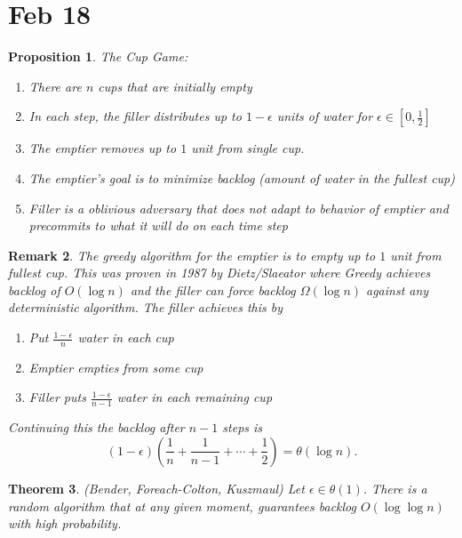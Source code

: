 \documentclass[a4paper]{article}
\newtheorem{thm}{Theorem}[section]
\newtheorem{rmk}[thm]{Remark}
\newtheorem{prop}[thm]{Proposition}
\begin{document}
\section{Feb 18}
\begin{prop}
    The Cup Game: 
    \begin{enumerate}
        \item There are $n$ cups that are initially empty 
        \item In each step, the filler distributes up to $1-\epsilon$ units of water for $\epsilon\in [0,\frac{1}{2}]$
        \item The emptier removes up to $1$ unit from single cup. 
        \item The emptier's goal is to minimize backlog (amount of water in the fullest cup)
        \item Filler is a oblivious adversary that does not adapt to behavior of emptier and precommits to what it will do on each time step 
    \end{enumerate}
\end{prop}
\begin{rmk}
    The greedy algorithm for the emptier is to empty up to $1$ unit from fullest cup. This was proven in 1987 by Dietz/Slaeator where Greedy achieves backlog of $O(\log n)$ and the filler can force backlog $\Omega(\log n)$ against any deterministic algorithm. The filler achieves this by 
    \begin{enumerate}
        \item Put $\frac{1-\epsilon}{n}$ water in each cup
        \item Emptier empties from some cup
        \item Filler puts $\frac{1-\epsilon}{n-1}$ water in each remaining cup 
    \end{enumerate}
    Continuing this the backlog after $n-1$ steps is \[
    (1-\epsilon) \left( \frac{1}{n}+ \frac{1}{n-1}+ \cdots + \frac{1}{2} \right)=\theta(\log n)
    .\] 
\end{rmk}
\begin{thm}
    (Bender, Foreach-Colton, Kuszmaul) Let $\epsilon\in \theta(1)$. There is a random algorithm that at any given moment, guarantees backlog $O(\log \log n)$ with high probability. 
\end{thm}
\end{document}
